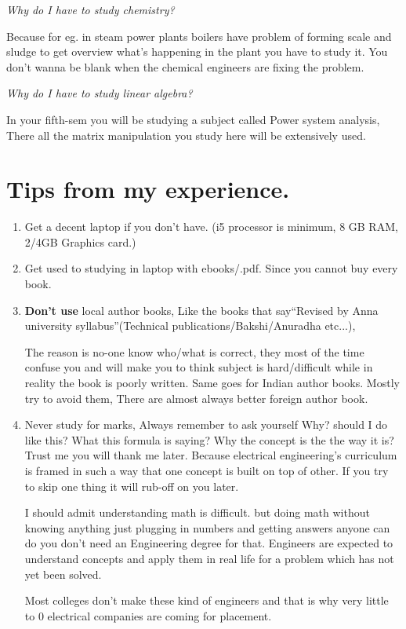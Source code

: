 \documentclass[a4paper,12pt]{article}
\begin{document}
\textit{Why do I have to study chemistry? }

Because for eg. in steam power plants boilers have problem of forming scale and sludge to get overview what's happening in the plant you have to study it. You don't wanna be blank when the chemical engineers are fixing the problem. 

\textit{Why do I have to study linear algebra?}

In your fifth-sem you will be studying a subject called Power system analysis, There all the matrix manipulation you study here will be extensively used.


\vspace{1in}


\section{Tips from my experience.}
\begin{enumerate}
    \item Get a decent laptop if you don't have. (i5 processor is minimum, 8 GB RAM, 2/4GB Graphics card.)
    
    \item Get used to studying in laptop with ebooks/.pdf. Since you cannot buy every book.
    
    \item\textbf{Don't use} local author books, Like the books that say``Revised by Anna university syllabus''(Technical publications/Bakshi/Anuradha etc...), 

    The reason is no-one know who/what is correct, they most of the time confuse you and will make you to think subject is hard/difficult while in reality the book is poorly written. Same goes for Indian author books. Mostly try to avoid them, There are almost always better foreign author book.

    \item Never study for marks, Always remember to ask yourself {\large{Why?}} should I do like this? What this formula is saying? Why the concept is the the way it is? Trust me you will thank me later. Because electrical engineering's curriculum is framed in such a way that one concept is built on top of other. If you try to skip one thing it will rub-off on you later. 

    I should admit understanding math is difficult. but doing math without knowing anything just plugging in numbers and getting answers anyone can do you don't need an Engineering degree for that. Engineers are expected to understand concepts and apply them in real life for a problem which has not yet been solved.

    Most colleges don't make these kind of engineers and that is why very little to 0 electrical companies are coming for placement.


\end{enumerate}
\end{document}
